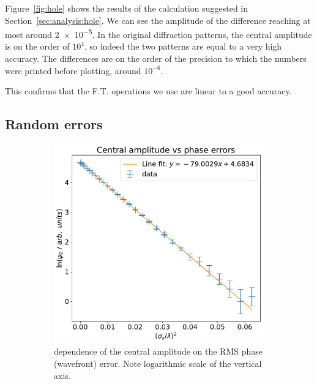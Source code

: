 \documentclass[11pt]{article}
\begin{document}
Figure~\ref{fig:hole} shows the results of the calculation suggested in Section~\ref{sec:analysis:hole}. We can see the amplitude of the difference reaching at most around \num{2e-5}. In the original diffraction patterns, the central amplitude is on the order of $10^4$, so indeed the two patterns are equal to a very high accuracy. The differences are on the order of the precision to which the numbers were printed before plotting, around $10^{-6}$.

This confirms that the F.T. operations we use are linear to a good accuracy.

\subsection{Random errors}\label{sec:res:rand}
\begin{figure}
    \centering
    \begin{subfigure}{0.45\textwidth}
        \centering
        \includegraphics[width=\textwidth]{pictures/rand/int}
        \caption{dependence of the central amplitude on the RMS phase (wavefront) error. Note logarithmic scale of the vertical axis.}\label{fig:rand:int}
    \end{subfigure}%
    \hfill
    \begin{subfigure}{0.45\textwidth}
        \centering

\end{subfigure}
\end{figure}
\end{document}

